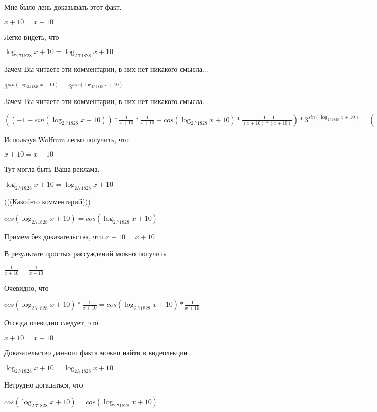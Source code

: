 \documentclass[12pt,a4paper,fleqn]{article}
\theoremstyle{definition}
\begin{document}
Мне было лень доказывать этот факт.

$ x  +  10  =  x  +  10 $

Легко видеть, что

$\log_{ 2.71828 }{ x  +  10 } = \log_{ 2.71828 }{ x  +  10 }$

Зачем Вы читаете эти комментарии, в них нет никакого смысла...

${ 3 }^{sin(\log_{ 2.71828 }{ x  +  10 })} = { 3 }^{sin(\log_{ 2.71828 }{ x  +  10 })}$

Зачем Вы читаете эти комментарии, в них нет никакого смысла...

$(( -1  - sin(\log_{ 2.71828 }{ x  +  10 })) * \frac{ 1 }{ x  +  10 }
 * \frac{ 1 }{ x  +  10 }
 + cos(\log_{ 2.71828 }{ x  +  10 }) * \frac{ -1  -  1 }{( x  +  10 ) * ( x  +  10 )}
) * { 3 }^{sin(\log_{ 2.71828 }{ x  +  10 })} = (( -1  - sin(\log_{ 2.71828 }{ x  +  10 })) * \frac{ 1 }{ x  +  10 }
 * \frac{ 1 }{ x  +  10 }
 + cos(\log_{ 2.71828 }{ x  +  10 }) * \frac{ -1  -  1 }{( x  +  10 ) * ( x  +  10 )}
) * { 3 }^{sin(\log_{ 2.71828 }{ x  +  10 })}$

Используя Wolfram легко получить, что

$ x  +  10  =  x  +  10 $

Тут могла быть Ваша реклама.

$\log_{ 2.71828 }{ x  +  10 } = \log_{ 2.71828 }{ x  +  10 }$

(((Какой-то комментарий)))

$cos(\log_{ 2.71828 }{ x  +  10 }) = cos(\log_{ 2.71828 }{ x  +  10 })$

Примем без доказательства, что
$ x  +  10  =  x  +  10 $

В результате простых рассуждений можно получить

$\frac{ 1 }{ x  +  10 }
 = \frac{ 1 }{ x  +  10 }
$

Очевидно, что

$cos(\log_{ 2.71828 }{ x  +  10 }) * \frac{ 1 }{ x  +  10 }
 = cos(\log_{ 2.71828 }{ x  +  10 }) * \frac{ 1 }{ x  +  10 }
$

Отсюда очевидно следует, что

$ x  +  10  =  x  +  10 $

Доказательство данного факта можно найти в \href{https://www.youtube.com/watch?v=dQw4w9WgXcQ}{видеолекции}

$\log_{ 2.71828 }{ x  +  10 } = \log_{ 2.71828 }{ x  +  10 }$

Нетрудно догадаться, что

$cos(\log_{ 2.71828 }{ x  +  10 }) = cos(\log_{ 2.71828 }{ x  +  10 })$
\end{document}
